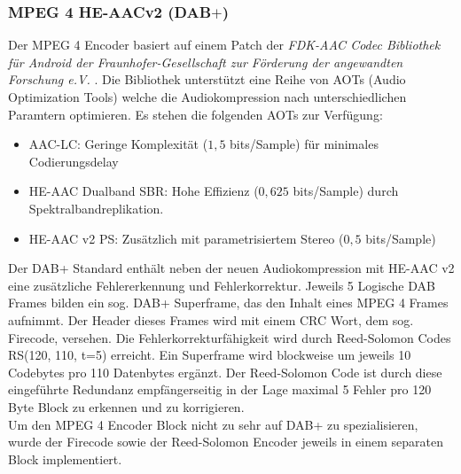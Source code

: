 \subsubsection{MPEG 4 HE-AACv2 (DAB$+$)}
Der MPEG 4 Encoder basiert auf einem Patch der \textit{FDK-AAC Codec Bibliothek für Android der Fraunhofer-Gesellschaft zur Förderung der angewandten Forschung e.V.} \cite{repo:fdk-aac}. Die Bibliothek unterstützt eine Reihe von AOTs (Audio Optimization Tools) welche die Audiokompression nach unterschiedlichen Paramtern optimieren. Es stehen die folgenden AOTs zur Verfügung:
\begin{itemize}
\item AAC-LC: Geringe Komplexität ($1,5$ bits/Sample) für minimales Codierungsdelay
\item HE-AAC Dualband SBR: Hohe Effizienz ($0,625$ bits/Sample) durch Spektralbandreplikation.
\item HE-AAC v2 PS: Zusätzlich mit parametrisiertem Stereo ($0,5$ bits/Sample)
\end{itemize}
Der DAB+ Standard enthält neben der neuen Audiokompression mit HE-AAC v2 eine zusätzliche Fehlererkennung und Fehlerkorrektur. Jeweils 5 Logische DAB Frames bilden ein sog. DAB+ Superframe, das den Inhalt eines MPEG 4 Frames aufnimmt. Der Header dieses Frames wird mit einem CRC Wort, dem sog. Firecode, versehen. Die Fehlerkorrekturfähigkeit wird durch Reed-Solomon Codes RS(120, 110, t=5) erreicht. Ein Superframe wird blockweise um jeweils 10 Codebytes pro 110 Datenbytes ergänzt. Der Reed-Solomon Code ist durch diese eingeführte Redundanz empfängerseitig in der Lage maximal 5 Fehler pro 120 Byte Block zu erkennen und zu korrigieren.\\
Um den MPEG 4 Encoder Block nicht zu sehr auf DAB+ zu spezialisieren, wurde der Firecode sowie der Reed-Solomon Encoder jeweils in einem separaten Block implementiert.

